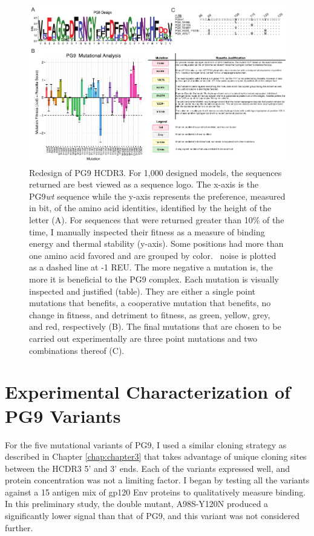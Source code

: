 \begin{figure}[!t]
   \centering
   \includegraphics[scale=1.5,width=.99\textwidth]{images/chapter4/figure4_3.pdf} %
   \caption[Redesign of PG9 HCDR3]{Redesign of PG9 HCDR3. For 1,000 designed models, the sequences returned are best viewed as a sequence logo. The x-axis is the PG9\textit{wt} sequence while the y-axis represents the preference, measured in bit, of the amino acid identities, identified by the height of the letter (A). For sequences that were returned greater than 10\% of the time, I manually inspected their fitness as a measure of binding energy and thermal stability (y-axis). Some positions had more than one amino acid favored and are grouped by color. \rosetta~noise is plotted as a dashed line at -1 REU. The more negative a mutation is, the more it is beneficial to the PG9 complex. Each mutation is visually inspected and justified (table). They are either a single point mutations that benefits, a cooperative mutation that benefits, no change in fitness, and detriment to fitness, as green, yellow, grey, and red, respectively (B). The final mutations that are chosen to be carried out experimentally are three point mutations and two combinations thereof (C).}
   \label{fig:figure4_3}
\end{figure}


\section{Experimental Characterization of PG9 Variants}
For the five mutational variants of PG9, I used a similar cloning strategy as described in Chapter \ref{chap:chapter3} that takes advantage of unique cloning sites between the HCDR3 5' and 3' ends. Each of the variants expressed well, and protein concentration was not a limiting factor. I began by testing all the variants against a 15 antigen mix of gp120 Env proteins to qualitatively measure binding. In this preliminary study, the double mutant, A98S-Y120N produced a significantly lower signal than that of PG9, and this variant was not considered further.

